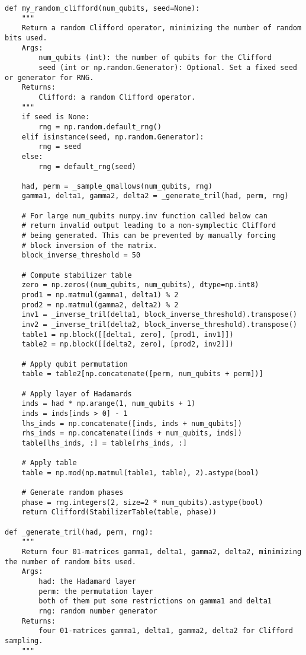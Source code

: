 \documentclass[8pt]{article}
\begin{document}
\begin{appendices}
\begin{verbatim}
def my_random_clifford(num_qubits, seed=None):
    """
    Return a random Clifford operator, minimizing the number of random bits used.
    Args:
        num_qubits (int): the number of qubits for the Clifford
        seed (int or np.random.Generator): Optional. Set a fixed seed or generator for RNG.
    Returns:
        Clifford: a random Clifford operator.
    """
    if seed is None:
        rng = np.random.default_rng()
    elif isinstance(seed, np.random.Generator):
        rng = seed
    else:
        rng = default_rng(seed)

    had, perm = _sample_qmallows(num_qubits, rng)
    gamma1, delta1, gamma2, delta2 = _generate_tril(had, perm, rng)

    # For large num_qubits numpy.inv function called below can
    # return invalid output leading to a non-symplectic Clifford
    # being generated. This can be prevented by manually forcing
    # block inversion of the matrix.
    block_inverse_threshold = 50

    # Compute stabilizer table
    zero = np.zeros((num_qubits, num_qubits), dtype=np.int8)
    prod1 = np.matmul(gamma1, delta1) % 2
    prod2 = np.matmul(gamma2, delta2) % 2
    inv1 = _inverse_tril(delta1, block_inverse_threshold).transpose()
    inv2 = _inverse_tril(delta2, block_inverse_threshold).transpose()
    table1 = np.block([[delta1, zero], [prod1, inv1]])
    table2 = np.block([[delta2, zero], [prod2, inv2]])

    # Apply qubit permutation
    table = table2[np.concatenate([perm, num_qubits + perm])]

    # Apply layer of Hadamards
    inds = had * np.arange(1, num_qubits + 1)
    inds = inds[inds > 0] - 1
    lhs_inds = np.concatenate([inds, inds + num_qubits])
    rhs_inds = np.concatenate([inds + num_qubits, inds])
    table[lhs_inds, :] = table[rhs_inds, :]

    # Apply table
    table = np.mod(np.matmul(table1, table), 2).astype(bool)

    # Generate random phases
    phase = rng.integers(2, size=2 * num_qubits).astype(bool)
    return Clifford(StabilizerTable(table, phase))

def _generate_tril(had, perm, rng):
    """
    Return four 01-matrices gamma1, delta1, gamma2, delta2, minimizing the number of random bits used.
    Args:
        had: the Hadamard layer
        perm: the permutation layer
        both of them put some restrictions on gamma1 and delta1
        rng: random number generator
    Returns:
        four 01-matrices gamma1, delta1, gamma2, delta2 for Clifford sampling.
    """
    

\end{verbatim}
\end{appendices}
\end{document}
